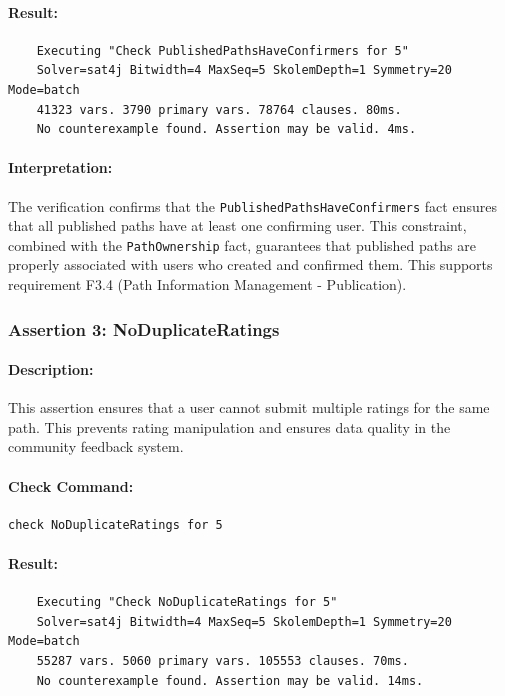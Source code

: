 \paragraph{Result:} 
\footnotesize
\begin{verbatim}
    Executing "Check PublishedPathsHaveConfirmers for 5"
    Solver=sat4j Bitwidth=4 MaxSeq=5 SkolemDepth=1 Symmetry=20 Mode=batch
    41323 vars. 3790 primary vars. 78764 clauses. 80ms.
    No counterexample found. Assertion may be valid. 4ms.
\end{verbatim}
\normalsize

\paragraph{Interpretation:} The verification confirms that the \texttt{PublishedPathsHaveConfirmers} fact ensures that all published paths have at least one confirming user. This constraint, combined with the \texttt{PathOwnership} fact, guarantees that published paths are properly associated with users who created and confirmed them. This supports requirement F3.4 (Path Information Management - Publication).

\subsubsection{Assertion 3: NoDuplicateRatings}
\paragraph{Description:} This assertion ensures that a user cannot submit multiple ratings for the same path. This prevents rating manipulation and ensures data quality in the community feedback system.

\paragraph{Check Command:}
\begin{verbatim}
check NoDuplicateRatings for 5
\end{verbatim}

\paragraph{Result:} 
\footnotesize
\begin{verbatim}
    Executing "Check NoDuplicateRatings for 5"
    Solver=sat4j Bitwidth=4 MaxSeq=5 SkolemDepth=1 Symmetry=20 Mode=batch
    55287 vars. 5060 primary vars. 105553 clauses. 70ms.
    No counterexample found. Assertion may be valid. 14ms.
\end{verbatim}
\normalsize

